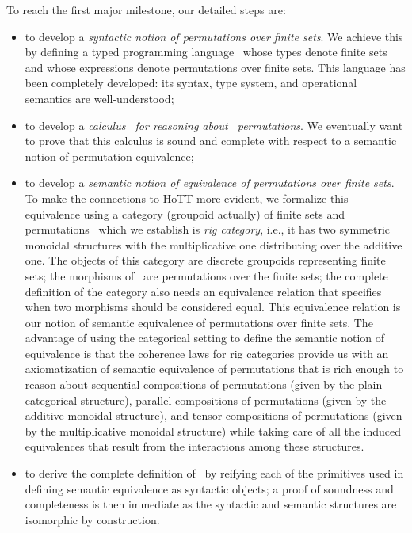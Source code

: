\documentclass{article}
\begin{document}
To reach the first major milestone, our detailed steps are:
\begin{itemize}

\item to develop a \emph{syntactic notion of permutations over finite
    sets}. We achieve this by defining a typed programming language
  \PiL\ whose types denote finite sets and whose expressions denote
  permutations over finite sets. This language has been completely
  developed: its syntax, type system, and operational semantics are
  well-understood;

\item to develop a \emph{calculus \PiCalc\ for reasoning about \PiL\
    permutations}. We eventually want to prove that this calculus is
  sound and complete with respect to a semantic notion of permutation
  equivalence;

\item to develop a \emph{semantic notion of equivalence of
    permutations over finite sets}.  To make the connections to HoTT
  more evident, we formalize this equivalence using a category
  (groupoid actually) of finite sets and permutations \PiCat\ which we
  establish is \emph{rig category}, i.e., it has two symmetric
  monoidal structures with the multiplicative one distributing over
  the additive one. The objects of this category are discrete
  groupoids representing finite sets; the morphisms of \PiCat\ are
  permutations over the finite sets; the complete definition of the
  category also needs an equivalence relation that specifies when two
  morphisms should be considered equal. This equivalence relation is
  our notion of semantic equivalence of permutations over finite
  sets. The advantage of using the categorical setting to define the
  semantic notion of equivalence is that the coherence laws for rig
  categories provide us with an axiomatization of semantic equivalence
  of permutations that is rich enough to reason about sequential
  compositions of permutations (given by the plain categorical
  structure), parallel compositions of permutations (given by the
  additive monoidal structure), and tensor compositions of
  permutations (given by the multiplicative monoidal structure) while
  taking care of all the induced equivalences that result from the
  interactions among these structures. 

\item to derive the complete definition of \PiCalc\ by reifying each
  of the primitives used in defining semantic equivalence as syntactic
  objects; a proof of soundness and completeness is then immediate as
  the syntactic and semantic structures are isomorphic by construction.


\end{itemize}
\end{document}
